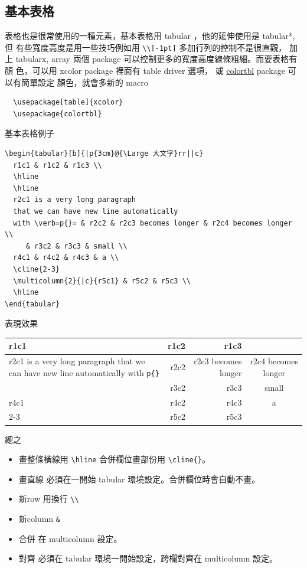   \subsection{基本表格}
  表格也是很常使用的一種元素，基本表格用 tabular ，他的延伸使用是 tabular*, 但
  有些寬度高度是用一些技巧例如用 \verb=\\[-1pt]= 多加行列的控制不是很直觀， 加
  上 tabularx, array 兩個 package 可以控制更多的寬度高度線條粗細。而要表格有顏
  色，可以用 xcolor package 裡面有 table driver 選項， 或
  \href{https://texdoc.org/serve/colortbl/0}{colortbl} package 可以有簡單設定
  顏色，就會多新的 macro
  \begin{verbatim}
  \usepackage[table]{xcolor}
  \usepackage{colortbl}
  \end{verbatim}
  基本表格例子
  \begin{verbatim}
\begin{tabular}[b]{|p{3cm}@{\Large 大文字}rr||c}
  r1c1 & r1c2 & r1c3 \\
  \hline
  \hline
  r2c1 is a very long paragraph 
  that we can have new line automatically 
  with \verb=p{}= & r2c2 & r2c3 becomes longer & r2c4 becomes longer  \\
     & r3c2 & r3c3 & small \\
  r4c1 & r4c2 & r4c3 & a \\
  \cline{2-3}
  \multicolumn{2}{|c}{r5c1} & r5c2 & r5c3 \\
  \hline
\end{tabular}
  \end{verbatim}
  表現效果
  \begin{center}
    \begin{tabular}[b]{|p{3cm}@{\Large 大文字}rr||c}
    r1c1 & r1c2 & r1c3 \\
    \hline
    \hline
    r2c1 is a very long paragraph 
    that we can have new line automatically 
    with \verb=p{}= & r2c2 & r2c3 becomes longer & r2c4 becomes longer  \\
       & r3c2 & r3c3 & small \\
    r4c1 & r4c2 & r4c3 & a \\
    \cline{2-3}
    \multicolumn{2}{|c}{r5c1} & r5c2 & r5c3 \\
    \hline
    \end{tabular}
  \end{center}
  總之
  \begin{itemize}
    \item 畫整條橫線用 \verb=\hline= 合併欄位畫部份用 \verb=\cline{}=。
    \item 畫直線 必須在一開始 tabular 環境設定。合併欄位時會自動不畫。
    \item 新row 用換行 \verb=\\=
    \item 新column \verb=&=
    \item 合併 在 multicolumn 設定。
    \item 對齊 必須在 tabular 環境一開始設定，跨欄對齊在 multicolumn 設定。
  \end{itemize}
